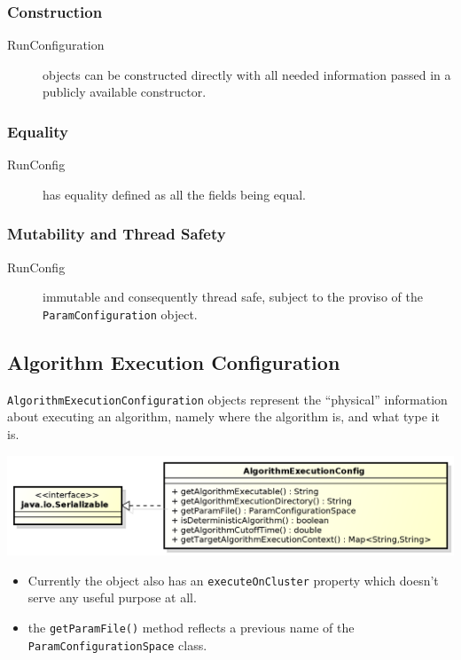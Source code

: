 \documentclass[11pt,letterpaper,oneside]{article}
\begin{document}
\subsubsection{Construction}
\begin{description}
\item[RunConfiguration] objects can be constructed directly with all needed information passed in a publicly available constructor.
\end{description}


\subsubsection{Equality}
\begin{description}
\item[RunConfig] has equality defined as all the fields being equal.
\end{description}

\subsubsection{Mutability and Thread Safety}
\begin{description}
\item[RunConfig] immutable and consequently thread safe, subject to the proviso of the \texttt{ParamConfiguration} object.
\end{description}

\subsection{Algorithm Execution Configuration}

\texttt{AlgorithmExecutionConfiguration} objects represent the ``physical'' information about executing an algorithm, namely where the algorithm is, and what type it is.

\begin{center}
\includegraphics[scale=0.75]{img/UML/ExecConfig.png}
\end{center}

\begin{itemize}
\item Currently the object also has an \texttt{executeOnCluster} property which doesn't serve any useful purpose at all.
\item the \texttt{getParamFile()} method reflects a previous name of the \texttt{ParamConfigurationSpace} class.
\end{itemize}
\end{document}
